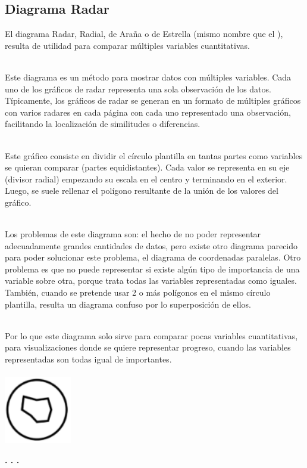 \documentclass{article}\usepackage[]{graphicx}\usepackage[]{color}
\begin{document}
\subsection{Diagrama Radar}
El diagrama Radar, Radial, de Ara\~na o de Estrella (mismo nombre que el ), resulta de utilidad para comparar m\'ultiples variables cuantitativas\cite{multidimensional}.~\\~\par
Este diagrama es un m\'etodo para mostrar datos con m\'ultiples variables. Cada uno de los gr\'aficos de radar representa una sola observaci\'on de los datos. T\'ipicamente, los gr\'aficos de radar se generan en un formato de m\'ultiples gr\'aficos con varios radares en cada p\'agina con cada uno representado una observaci\'on, facilitando la localizaci\'on de similitudes o diferencias\cite{radar-book}.~\\~\par
Este gr\'afico consiste en dividir el c\'irculo plantilla en tantas partes como variables se quieran comparar (partes equidistantes). Cada valor se representa en su eje (divisor radial) empezando su escala en el centro y terminando en el exterior. Luego, se suele rellenar el pol\'igono resultante de la uni\'on de los valores del gr\'afico\cite{book-radar}.~\\~\par
Los problemas de este diagrama son: el hecho de no poder representar adecuadamente grandes cantidades de datos, pero existe otro diagrama parecido para poder solucionar este problema, el diagrama de coordenadas paralelas\cite{multivariable}. Otro problema es que no puede representar si existe alg\'un tipo de importancia de una variable sobre otra, porque trata todas las variables representadas como iguales\cite{book-radar}. Tambi\'en, cuando se pretende usar 2 o m\'as pol\'igonos en el mismo c\'irculo plantilla, resulta un diagrama confuso por lo superposici\'on de ellos.~\\~\par
Por lo que este diagrama solo sirve para comparar pocas variables cuantitativas, para visualizaciones donde se quiere representar progreso, cuando las variables representadas son todas igual de importantes\cite{book-radar}.
~\\~\\
\vbox{
    \centering
    \includegraphics[width=0.22\textwidth]{imag/radar}
}
\begin{center}
\textbf{. . .}
\end{center}
\end{document}
